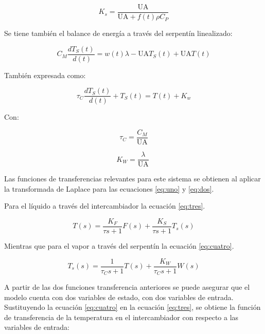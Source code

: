 \documentclass[12pt,letterpaper]{article}     %
\begin{document}
\begin{equation}
K_s =\frac{\mathrm{UA}}{\mathrm{UA}+f(t) \rho C_P  } 
\end{equation}

Se tiene también el balance de energía a través del serpentín linealizado:

\begin{equation}
C_M \frac{dT  _S \left(t\right)}{\;d\left(t\right)}=w\left(t\right)\lambda -\mathrm{UA}T  _S\left(t\right)+\mathrm{UA}T \left(t\right)
\label{eq:dos}
\end{equation}

También expresada como:

\begin{equation}
\tau  _C \frac{dT  _S \left(t\right)}{\;d\left(t\right)}+T  _S \left(t\right)=T \left(t\right)+K_w
\end{equation}

Con:

\begin{equation}
\tau  _C =\frac{C_M }{\mathrm{UA}}
\end{equation}

\begin{equation}
K_W =\frac{\lambda }{\mathrm{UA}}\;
\end{equation}

Las funciones de transferencias relevantes para este sistema se obtienen al aplicar la transformada de Laplace para las ecuaciones \ref{eq:uno} y \ref{eq:dos}.

Para el líquido a través del intercambiador la ecuación \ref{eq:tres}.

\begin{equation}
T \left(s\right)=\frac{K_F }{\tau s+1}F\left(s\right)+\frac{K_S }{\tau s+1}T_s \left(s\right)
\label{eq:tres}
\end{equation}

Mientras que para el vapor a través del serpentín la ecuación \ref{eq:cuatro}.


\begin{equation}
T_s \left(s\right)=\frac{1}{\tau  _C s+1}T \left(s\right)+\frac{K_W }{\tau_C s+1}W\left(s\right)
\label{eq:cuatro}
\end{equation}

A partir de las dos funciones transferencia anteriores se puede asegurar que el modelo cuenta con dos variables de estado, con dos variables de entrada. Sustituyendo la ecuación \ref{eq:cuatro} en la ecuación \ref{eq:tres}, se obtiene la función de transferencia de la temperatura en el intercambiador con respecto a las variables de entrada:
\end{document}
